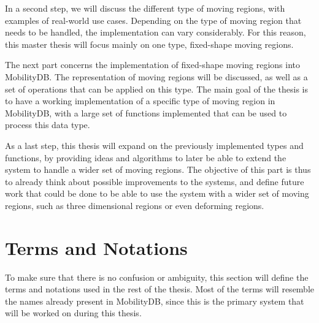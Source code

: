In a second step, we will discuss the different type of moving regions, with examples of real-world use cases. Depending on the type of moving region that needs to be handled, the implementation can vary considerably. For this reason, this master thesis will focus mainly on one type, fixed-shape moving regions.

The next part concerns the implementation of fixed-shape moving regions into MobilityDB. The representation of moving regions will be discussed, as well as a set of operations that can be applied on this type. The main goal of the thesis is to have a working implementation of a specific type of moving region in MobilityDB, with a large set of functions implemented that can be used to process this data type.

As a last step, this thesis will expand on the previously implemented types and functions, by providing ideas and algorithms to later be able to extend the system to handle a wider set of moving regions. The objective of this part is thus to already think about possible improvements to the systems, and define future work that could be done to be able to use the system with a wider set of moving regions, such as three dimensional regions or even deforming regions.

\section{Terms and Notations}

To make sure that there is no confusion or ambiguity, this section will define the terms and notations used in the rest of the thesis. Most of the terms will resemble the names already present in MobilityDB, since this is the primary system that will be worked on during this thesis.

